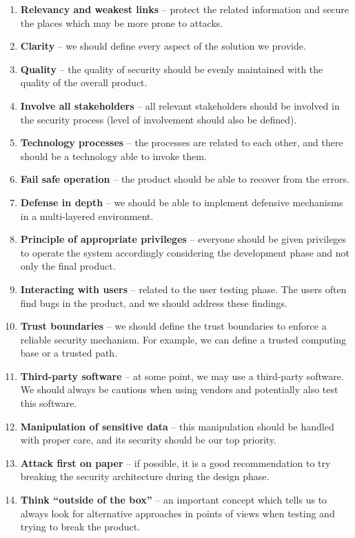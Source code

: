 \documentclass[12pt,a4,twoside]{article}
\begin{document}
\begin{enumerate}
    \item \textbf{Relevancy and weakest links} -- protect the related information and secure the places which may be more prone to attacks.
    \item \textbf{Clarity} -- we should define every aspect of the solution we provide.
    \item \textbf{Quality} -- the quality of security should be evenly maintained with the quality of the overall product.
    \item \textbf{Involve all stakeholders} -- all relevant stakeholders should be involved in the security process (level of involvement should also be defined).
    \item \textbf{Technology processes} -- the processes are related to each other, and there should be a technology able to invoke them.
    \item \textbf{Fail safe operation} -- the product should be able to recover from the errors.
    \item \textbf{Defense in depth} -- we should be able to implement defensive mechanisms in a multi-layered environment.
    \item \textbf{Principle of appropriate privileges} -- everyone should be given privileges to operate the system accordingly considering the development phase and not only the final product.
    \item \textbf{Interacting with users} -- related to the user testing phase. The users often find bugs in the product, and we should address these findings.
    \item \textbf{Trust boundaries} -- we should define the trust boundaries to enforce a reliable security mechanism. For example, we can define a trusted computing base or a trusted path.
    \item \textbf{Third-party software} -- at some point, we may use a third-party software. We should always be cautious when using vendors and potentially also test this software.
    \item \textbf{Manipulation of sensitive data} -- this manipulation should be handled with proper care, and its security should be our top priority.
    \item \textbf{Attack first on paper} -- if possible, it is a good recommendation to try breaking the security architecture during the design phase.
    \item \textbf{Think ``outside of the box''} -- an important concept which tells us to always look for alternative approaches in points of views when testing and trying to break the product.

\end{enumerate}
\end{document}
